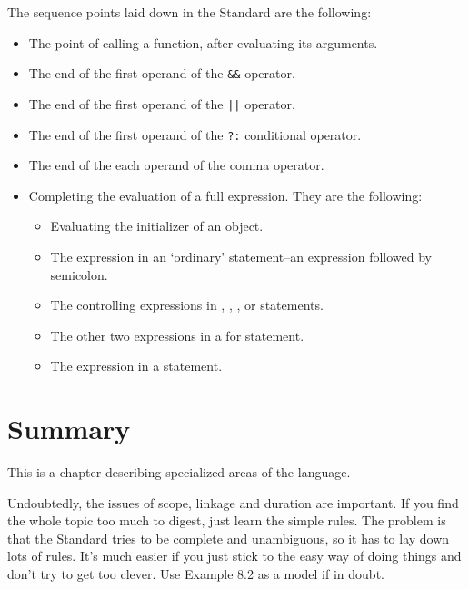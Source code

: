   The sequence points laid down in the Standard are the following:


  \begin{itemize}
   \item The point of calling a function, after evaluating its arguments.

   \item The end of the first operand of the \texttt{\&\&}
    operator.

   \item The end of the first operand of the \texttt{||} operator.

   \item The end of the first operand of the \texttt{?:} conditional
    operator.

   \item The end of the each operand of the comma operator.

   \item Completing the evaluation of a full expression. They are the
    following:

    \begin{itemize}
     \item Evaluating the initializer of an \auto{} object.

     \item The expression in an `ordinary' statement--an expression
      followed by semicolon.

     \item The controlling expressions in \kdo, \while,
      \kif, \switch{} or \for{}
      statements.

     \item The other two expressions in a for statement.

     \item The expression in a \return{} statement.
    \end{itemize}
   
  \end{itemize}

 
        \section{Summary}
        


  This is a chapter describing specialized areas of the language.


  Undoubtedly, the issues of scope, linkage and duration are important.
   If you find the whole topic too much to digest, just learn the simple
   rules. The problem is that the Standard tries to be complete and
   unambiguous, so it has to lay down lots of rules. It's much easier if
   you just stick to the easy way of doing things and don't try to get
   too clever. Use Example 8.2 as a model if in doubt.


